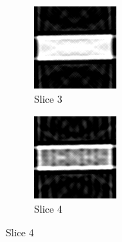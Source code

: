 \documentclass{article}
\begin{document}
\begin{figure}[t!]
\medskip
\begin{subfigure}{0.45\textwidth}
\includegraphics[width=\linewidth]{s_03.png}
\caption{Slice 3} \label{fig:c}
\end{subfigure}\hspace*{\fill}
\begin{subfigure}{0.45\textwidth}
\includegraphics[width=\linewidth]{s_04.png}
\caption{Slice 4} \label{fig:d}
\end{subfigure}


\end{figure}
\end{document}
